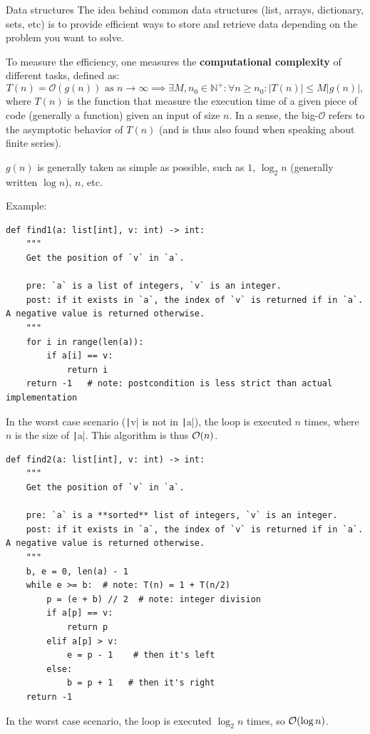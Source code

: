 \documentclass[10pt,
aspectratio=169
]{beamer}
\begin{document}
\begin{frame}{Data structures}
The idea behind common data structures (list, arrays, dictionary, sets, etc) is to provide efficient ways to store and retrieve data depending on the problem you want to solve.

To measure the efficiency, one measures the \textbf{computational complexity} of different tasks, defined as:\begin{equation*}
	T(n) = \mathcal{O}(g(n))  \text{ as } n\to\infty \implies \exists M, n_0\in\mathbb{N}^+: \forall n\geq n_0: |T(n)| \leq M |g(n)|,
\end{equation*}
where $T(n)$ is the function that measure the execution time of a given piece of code (generally a function) given an input of size $n$. In a sense, the big-$\mathcal{O}$ refers to the asymptotic behavior of $T(n)$ (and is thus also found when speaking about finite series). 

$g(n)$ is generally taken as simple as possible, such as $1$, $\log_2 n$ (generally written $\log n$), $n$, etc.
\end{frame}


\begin{frame}[fragile]
	Example:\begin{verbatim}
def find1(a: list[int], v: int) -> int:
	"""
	Get the position of `v` in `a`.
	
	pre: `a` is a list of integers, `v` is an integer.
	post: if it exists in `a`, the index of `v` is returned if in `a`. A negative value is returned otherwise.
	"""
	for i in range(len(a)): 
		if a[i] == v:
			return i 
	return -1   # note: postcondition is less strict than actual implementation
	\end{verbatim}
In the worst case scenario (\texttt|v| is not in \texttt|a|), the loop is executed $n$ times, where $n$ is the size of \texttt|a|. This algorithm is thus $\mathcal{O}(n)$.
\end{frame}

\begin{frame}[fragile]
\begin{verbatim}
def find2(a: list[int], v: int) -> int:
	"""
	Get the position of `v` in `a`.
	
	pre: `a` is a **sorted** list of integers, `v` is an integer.
	post: if it exists in `a`, the index of `v` is returned if in `a`. A negative value is returned otherwise.
	"""
	b, e = 0, len(a) - 1
	while e >= b:  # note: T(n) = 1 + T(n/2)
		p = (e + b) // 2  # note: integer division
		if a[p] == v:
			return p
		elif a[p] > v:
			e = p - 1    # then it's left
		else:
			b = p + 1   # then it's right
	return -1
\end{verbatim}
In the worst case scenario, the loop is executed $\log_2 n$ times, so $\mathcal{O}(\log n)$.
\end{frame}
\end{document}
